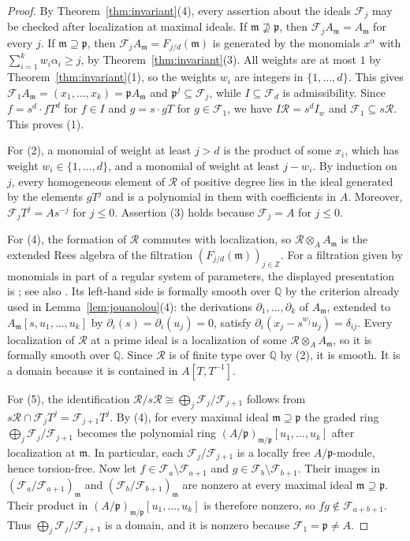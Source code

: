 \documentclass[11pt]{amsart}
\numberwithin{equation}{section}
\theoremstyle{definition}
\newcommand{\Q}{\mathbb{Q}}
\newcommand{\Z}{\mathbb{Z}}
\newcommand{\fm}{\mathfrak{m}}
\newcommand{\fp}{\mathfrak{p}}
\newcommand{\cF}{\mathcal{F}}
\newcommand{\cR}{\mathcal{R}}
\begin{document}
\begin{proof}
By Theorem~\ref{thm:invariant}(4), every assertion about the ideals $\cF_j$ may be checked after localization at maximal ideals. If $\fm\not\supseteq\fp$, then $\cF_jA_\fm=A_\fm$ for every $j$. If $\fm\supseteq\fp$, then $\cF_jA_\fm=F_{j/d}(\fm)$ is generated by the monomials $x^\alpha$ with $\sum_{i=1}^k w_i\alpha_i\ge j$, by Theorem~\ref{thm:invariant}(3). All weights are at most $1$ by Theorem~\ref{thm:invariant}(1), so the weights $w_i$ are integers in $\{1,\ldots,d\}$. This gives $\cF_1A_\fm=(x_1,\ldots,x_k)=\fp A_\fm$ and $\fp^j\subseteq\cF_j$, while $I\subseteq\cF_d$ is admissibility. Since $f=s^d\cdot fT^d$ for $f\in I$ and $g=s\cdot gT$ for $g\in\cF_1$, we have $I\cR=s^dI_w$ and $\cF_1\subseteq s\cR$. This proves (1).

For (2), a monomial of weight at least $j>d$ is the product of some $x_i$, which has weight $w_i\in\{1,\ldots,d\}$, and a monomial of weight at least $j-w_i$. By induction on $j$, every homogeneous element of $\cR$ of positive degree lies in the ideal generated by the elements $gT^j$ and is a polynomial in them with coefficients in $A$. Moreover, $\cF_jT^j=As^{-j}$ for $j\le0$. Assertion (3) holds because $\cF_j=A$ for $j\le0$.

For (4), the formation of $\cR$ commutes with localization, so $\cR\otimes_AA_\fm$ is the extended Rees algebra of the filtration $(F_{j/d}(\fm))_{j\in\Z}$. For a filtration given by monomials in part of a regular system of parameters, the displayed presentation is \cite[Proposition~5.2.2]{QR}; see also \cite[Equation~(2.3)]{Brais}. Its left-hand side is formally smooth over $\Q$ by the criterion \cite[Tag~031J]{Stacks} already used in Lemma~\ref{lem:jouanolou}(4): the derivations $\partial_1,\ldots,\partial_k$ of $A_\fm$, extended to $A_\fm[s,u_1,\ldots,u_k]$ by $\partial_i(s)=\partial_i(u_j)=0$, satisfy $\partial_i(x_j-s^{w_j}u_j)=\delta_{ij}$. Every localization of $\cR$ at a prime ideal is a localization of some $\cR\otimes_AA_\fm$, so it is formally smooth over $\Q$. Since $\cR$ is of finite type over $\Q$ by (2), it is smooth. It is a domain because it is contained in $A[T,T^{-1}]$.

For (5), the identification $\cR/s\cR\cong\bigoplus_j\cF_j/\cF_{j+1}$ follows from $s\cR\cap\cF_jT^j=\cF_{j+1}T^j$. By (4), for every maximal ideal $\fm\supseteq\fp$ the graded ring $\bigoplus_j\cF_j/\cF_{j+1}$ becomes the polynomial ring $(A/\fp)_{\fm/\fp}[u_1,\ldots,u_k]$ after localization at $\fm$. In particular, each $\cF_j/\cF_{j+1}$ is a locally free $A/\fp$-module, hence torsion-free. Now let $f\in\cF_a\setminus\cF_{a+1}$ and $g\in\cF_b\setminus\cF_{b+1}$. Their images in $(\cF_a/\cF_{a+1})_\fm$ and $(\cF_b/\cF_{b+1})_\fm$ are nonzero at every maximal ideal $\fm\supseteq\fp$. Their product in $(A/\fp)_{\fm/\fp}[u_1,\ldots,u_k]$ is therefore nonzero, so $fg\notin\cF_{a+b+1}$. Thus $\bigoplus_j\cF_j/\cF_{j+1}$ is a domain, and it is nonzero because $\cF_1=\fp\ne A$.
\end{proof}
\end{document}
